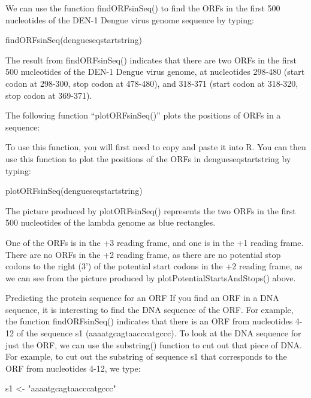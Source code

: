 \documentclass[
]{book}
\newenvironment{Shaded}{\begin{snugshade}}{\end{snugshade}}
\newcommand{\FunctionTok}[1]{\textcolor[rgb]{0.00,0.00,0.00}{#1}}
\newcommand{\NormalTok}[1]{#1}
\newcommand{\OtherTok}[1]{\textcolor[rgb]{0.56,0.35,0.01}{#1}}
\newcommand{\StringTok}[1]{\textcolor[rgb]{0.31,0.60,0.02}{#1}}
\begin{document}
We can use the function findORFsinSeq() to find the ORFs in the first 500 nucleotides of the DEN-1 Dengue virus genome sequence by typing:

\begin{Shaded}
\begin{Highlighting}[]
\FunctionTok{findORFsinSeq}\NormalTok{(dengueseqstartstring)}
\end{Highlighting}
\end{Shaded}

The result from findORFsinSeq() indicates that there are two ORFs in the first 500 nucleotides of the DEN-1 Dengue virus genome, at nucleotides 298-480 (start codon at 298-300, stop codon at 478-480), and 318-371 (start codon at 318-320, stop codon at 369-371).

The following function ``plotORFsinSeq()'' plots the positions of ORFs in a sequence:

To use this function, you will first need to copy and paste it into R. You can then use this function to plot the positions of the ORFs in dengueseqstartstring by typing:

\begin{Shaded}
\begin{Highlighting}[]
\FunctionTok{plotORFsinSeq}\NormalTok{(dengueseqstartstring)}
\end{Highlighting}
\end{Shaded}

The picture produced by plotORFsinSeq() represents the two ORFs in the first 500 nucleotides of the lambda genome as blue rectangles.

One of the ORFs is in the +3 reading frame, and one is in the +1 reading frame. There are no ORFs in the +2 reading frame, as there are no potential stop codons to the right (3') of the potential start codons in the +2 reading frame, as we can see from the picture produced by plotPotentialStartsAndStops() above.

Predicting the protein sequence for an ORF
If you find an ORF in a DNA sequence, it is interesting to find the DNA sequence of the ORF. For example, the function findORFsinSeq() indicates that there is an ORF from nucleotides 4-12 of the sequence s1 (aaaatgcagtaacccatgccc). To look at the DNA sequence for just the ORF, we can use the substring() function to cut out that piece of DNA. For example, to cut out the substring of sequence s1 that corresponds to the ORF from nucleotides 4-12, we type:

\begin{Shaded}
\begin{Highlighting}[]
\NormalTok{s1 }\OtherTok{\textless{}{-}} \StringTok{"aaaatgcagtaacccatgccc"}
\end{Highlighting}
\end{Shaded}
\end{document}
